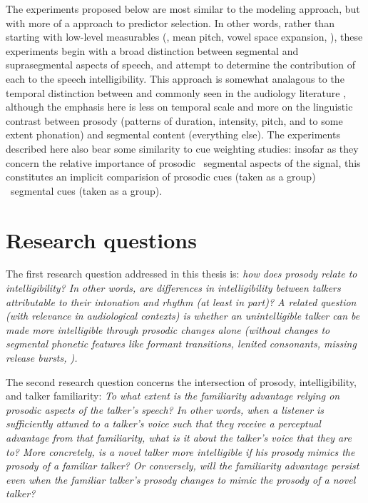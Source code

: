 The experiments proposed below are most similar to the modeling approach, but with more of a  approach to predictor selection.  In other words, rather than starting with low-level measurables (\eg, mean pitch, vowel space expansion, \etc), these experiments begin with a broad distinction between segmental and suprasegmental aspects of speech, and attempt to determine the contribution of each to the speech intelligibility.  This approach is somewhat analagous to the temporal distinction between  and  commonly seen in the audiology literature \citep[\eg][]{Rosen1992}, although the emphasis here is less on temporal scale and more on the linguistic contrast between prosody (patterns of duration, intensity, pitch, and to some extent phonation) and segmental content (everything else).  The experiments described here also bear some similarity to cue weighting studies: insofar as they concern the relative importance of prosodic \vs\ segmental aspects of the signal, this constitutes an implicit comparision of prosodic cues (taken as a group) \vs\ segmental cues (taken as a group).

\section{Research questions}
The first research question addressed in this thesis is: \em{how does prosody relate to intelligibility?}  In other words, are differences in intelligibility between talkers attributable to their intonation and rhythm (at least in part)?  A related question (with relevance in audiological contexts) is whether an unintelligible talker can be made more intelligible through prosodic changes alone (without changes to segmental phonetic features like formant transitions, lenited consonants, missing release bursts, \etc).


The second research question concerns the intersection of prosody, intelligibility, and talker familiarity: \em{To what extent is the familiarity advantage relying on prosodic aspects of the talker’s speech?}  In other words, when a  listener is sufficiently attuned to a talker’s voice such that they receive a perceptual advantage from that familiarity, what is it about the talker’s voice that they are  to?  More concretely, is a novel talker more intelligible if his prosody mimics the prosody of a familiar talker?  Or conversely, will the familiarity advantage persist even when the familiar talker’s prosody changes to mimic the prosody of a novel talker?

